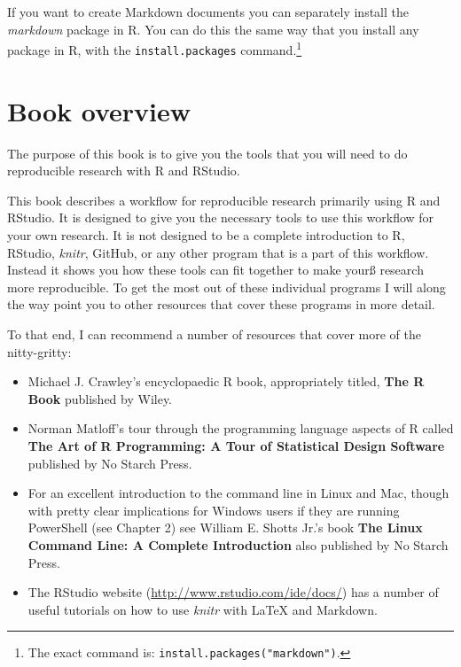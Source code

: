 If you want to create Markdown documents you can separately install the {\emph{markdown}} package in R. You can do this the same way that you install any package in R, with the {\tt{install.packages}} command.\footnote{The exact command is: {\tt{install.packages("markdown")}}.} 


\section{Book overview}

The purpose of this book is to give you the tools that you will need to do reproducible research with R and RStudio. 

This book describes a workflow for reproducible research primarily using R and RStudio. It is designed to give you the necessary tools to use this workflow for your own research. It is not designed to be a complete introduction to R, RStudio, {\emph{knitr}}, GitHub, or any other program that is a part of this workflow. Instead it shows you how these tools can fit together to make yourß research more reproducible. To get the most out of these individual programs I will along the way point you to other resources that cover these programs in more detail.

To that end, I can recommend a number of resources that cover more of the nitty-gritty:

\begin{itemize}
    \item Michael J. Crawley's encyclopaedic R book, appropriately titled, \textbf{The R Book} published by Wiley.
    
    \item Norman Matloff's tour through the programming language aspects of  R called \textbf{The Art of R Programming: A Tour of Statistical Design Software} published by No Starch Press.
    
    \item For an excellent introduction to the command line in Linux and Mac, though with pretty clear implications for Windows users if they are running PowerShell (see Chapter 2) see William E. Shotts Jr.'s book \textbf{The Linux Command Line: A Complete Introduction} also published by No Starch Press.
    
    \item The RStudio website (\url{http://www.rstudio.com/ide/docs/}) has a
  number of useful tutorials on how to use {\emph{knitr}} with LaTeX and Markdown.
\end{itemize}

